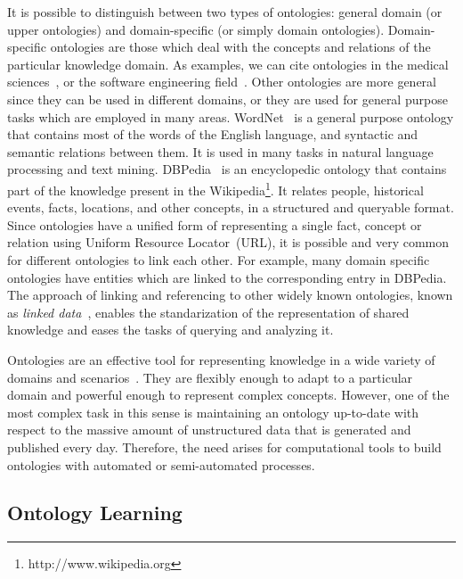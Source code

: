 It is possible to distinguish between two types of ontologies: general domain (or upper ontologies) and domain-specific (or simply domain ontologies).
Domain-specific ontologies are those which deal with the concepts and relations of the particular knowledge domain.
As examples, we can cite ontologies in the medical sciences~\cite{rector2003opengalen,gene2004gene},
or the software engineering field~\cite{4641930}.
Other ontologies are more general since they can be used in different domains, or they are used for general
purpose tasks which are employed in many areas.
WordNet~\cite{miller1995wordnet} is a general purpose ontology that contains most of the words of the English language,
and syntactic and semantic relations between them.
It is used in many tasks in natural language processing and text mining.
DBPedia~\cite{mendes2012dbpedia} is an encyclopedic ontology that contains part of the knowledge present in the
Wikipedia\footnote{http://www.wikipedia.org}.
It relates people, historical events, facts, locations, and other concepts, in a structured and queryable format.
Since ontologies have a unified form of representing a single fact, concept or relation using Uniform Resource Locator~(URL), it is
possible and very common for different ontologies to link each other. For example, many domain specific ontologies
have entities which are linked to the corresponding entry in DBPedia. The approach of linking and referencing to other
widely known ontologies, known as \textit{linked data}~\cite{bizer2009linked},
enables the standarization of the representation of shared knowledge and eases the tasks of querying and analyzing it.

Ontologies are an effective tool for representing knowledge in a wide
variety of domains and scenarios~\cite{staab2010handbook}.
They are flexibly enough to adapt to a particular domain and powerful enough to represent complex concepts.
However, one of the most complex task in this sense is maintaining
an ontology up-to-date with respect to the massive amount of unstructured data that is generated and published every day.
Therefore, the need arises for computational tools to build ontologies with automated or semi-automated processes.

\subsection{Ontology Learning}

